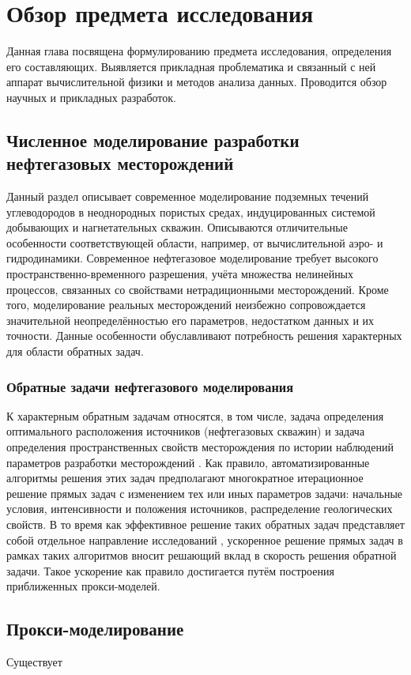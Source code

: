 \chapter{Обзор предмета исследования}\label{ch:ch1}

Данная глава посвящена формулированию предмета исследования, определения его составляющих.
Выявляется прикладная проблематика и связанный с ней аппарат вычислительной физики и методов анализа данных. Проводится обзор научных и прикладных разработок.

\section{Численное моделирование разработки нефтегазовых месторождений}

Данный раздел описывает современное моделирование подземных течений углеводородов в неоднородных пористых средах, индуцированных системой добывающих и нагнетательных скважин.
Описываются отличительные особенности соответствующей области, например, от вычислительной аэро- и гидродинамики.
Современное нефтегазовое моделирование требует высокого пространственно-временного разрешения, учёта множества нелинейных процессов, связанных со свойствами нетрадиционными месторождений.
Кроме того, моделирование реальных месторождений неизбежно сопровождается значительной неопределённостью его параметров, недостатком данных и их точности.
Данные особенности обуславливают потребность решения характерных для области обратных задач.

\subsection{Обратные задачи нефтегазового моделирования}
К характерным обратным задачам относятся, в том числе, задача определения оптимального расположения источников (нефтегазовых скважин) \todo{\cite{}} и задача определения пространственных свойств месторождения по истории наблюдений параметров разработки месторождений \todo{\cite{}}.
Как правило, автоматизированные алгоритмы решения этих задач предполагают многократное итерационное решение прямых задач с изменением тех или иных параметров задачи: начальные условия, интенсивности и положения источников, распределение геологических свойств. В то время как эффективное решение таких обратных задач представляет собой отдельное направление исследований , ускоренное решение прямых задач в рамках таких алгоритмов вносит решающий вклад в скорость решения обратной задачи. Такое ускорение как правило достигается путём построения приближенных прокси-моделей.

\section{Прокси-моделирование}

Существует
